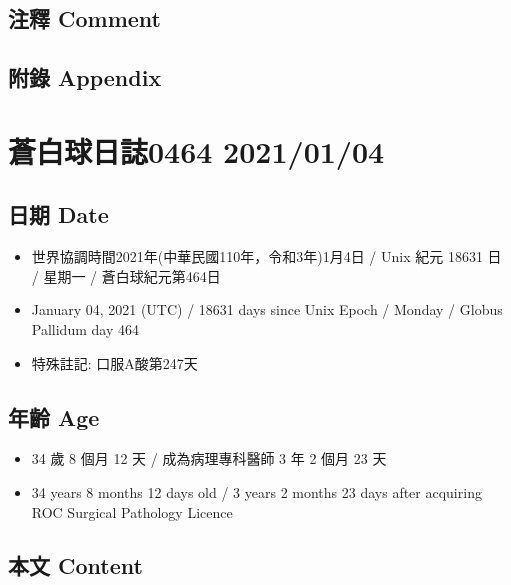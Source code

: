 \documentclass[a5paper, 10pt
]{book}
\providecommand{\tightlist}{%
  \setlength{\itemsep}{0pt}\setlength{\parskip}{0pt}}
\begin{document}
\hypertarget{ux6ce8ux91cb-comment-33}{%
\subsection{注釋 Comment}\label{ux6ce8ux91cb-comment-33}}

\hypertarget{ux9644ux9304-appendix-33}{%
\subsection{附錄 Appendix}\label{ux9644ux9304-appendix-33}}

\hypertarget{ux84bcux767dux7403ux65e5ux8a8c0464-20210104}{%
\section{蒼白球日誌0464
2021/01/04}\label{ux84bcux767dux7403ux65e5ux8a8c0464-20210104}}

\hypertarget{ux65e5ux671f-date-34}{%
\subsection{日期 Date}\label{ux65e5ux671f-date-34}}

\begin{itemize}
\tightlist
\item
  世界協調時間2021年(中華民國110年，令和3年)1月4日 / Unix 紀元 18631 日
  / 星期一 / 蒼白球紀元第464日
\item
  January 04, 2021 (UTC) / 18631 days since Unix Epoch / Monday / Globus
  Pallidum day 464
\item
  特殊註記: 口服A酸第247天
\end{itemize}

\hypertarget{ux5e74ux9f61-age-34}{%
\subsection{年齡 Age}\label{ux5e74ux9f61-age-34}}

\begin{itemize}
\tightlist
\item
  34 歲 8 個月 12 天 / 成為病理專科醫師 3 年 2 個月 23 天
\item
  34 years 8 months 12 days old / 3 years 2 months 23 days after
  acquiring ROC Surgical Pathology Licence
\end{itemize}

\hypertarget{ux672cux6587-content-34}{%
\subsection{本文 Content}\label{ux672cux6587-content-34}}
\end{document}

